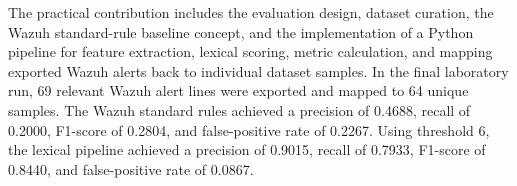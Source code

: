\documentclass[12pt,a4paper,oneside,parskip=half]{scrreprt}
\begin{document}
The practical contribution includes the evaluation design, dataset curation, the Wazuh standard-rule baseline concept, and the implementation of a Python pipeline for feature extraction, lexical scoring, metric calculation, and mapping exported Wazuh alerts back to individual dataset samples. In the final laboratory run, 69 relevant Wazuh alert lines were exported and mapped to 64 unique samples. The Wazuh standard rules achieved a precision of 0.4688, recall of 0.2000, F1-score of 0.2804, and false-positive rate of 0.2267. Using threshold 6, the lexical pipeline achieved a precision of 0.9015, recall of 0.7933, F1-score of 0.8440, and false-positive rate of 0.0867.
\clearpage

\tableofcontents
\clearpage
{}
{}
\listoffigures
\clearpage
{}
{}
\listoftables
\clearpage
{}
{}
\lstlistoflistings
\clearpage
\end{document}
